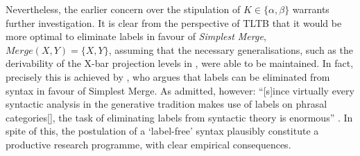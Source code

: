 Nevertheless, the earlier concern over the stipulation of $K\in\{\alpha,\beta\}$ warrants further investigation. It is clear from the perspective of TLTB that it would be more optimal to eliminate labels in favour of \textit{Simplest Merge}, $Merge(X,Y) = \{X,Y\}$, assuming that the necessary generalisations, such as the derivability of the X-bar projection levels in , were able to be maintained. In fact, precisely this is achieved by \textcite{CollinsC_2002}, who argues that labels can be eliminated from syntax in favour of Simplest Merge. As admitted, however: ``[s]ince virtually every syntactic analysis in the generative tradition makes use of labels on phrasal categories[], the task of eliminating labels from syntactic theory is enormous'' \parencite[44]{CollinsC_2002}. In spite of this, the postulation of a `label-free' syntax plausibly constitute a productive research programme, with clear empirical consequences.

